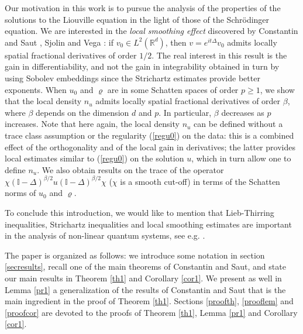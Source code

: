 \documentclass[12pt]{article}
\def \Rm {\mathbb R}
\def\II{\mathbb{I}}
\def\fref#1{{\rm (\ref{#1})}}
\begin{document}
Our motivation in this work is to pursue the analysis of the properties of the solutions to the Liouville equation in the light of those of the Schr\"odinger equation. We are interested in the \textit{local smoothing effect} discovered by Constantin and Saut \cite{ConstSaut}, Sjolin \cite{sjolin} and Vega \cite{vega}: if $v_0 \in L^2(\Rm^d)$, then $v=e^{it\Delta}v_0$ admits locally spatial fractional derivatives of order $1/2$. The real interest in this result is the gain in differentiability, and not the gain in integrability obtained in turn by using Sobolev embeddings since the Strichartz estimates provide better exponents. When $u_0$ and $\varrho$ are in some Schatten spaces of order $p\geq 1$, we show that the local density $n_u$ admits locally spatial fractional derivatives of order $\beta$, where $\beta$ depends on the dimension $d$ and $p$. In particular, $\beta$ decreases as $p$ increases. Note that here again, the local density $n_u$ can be defined without a trace class assumption or the regularity \fref{regu0} on the data: this is a combined effect of the orthogonality and of the local gain in derivatives; the latter provides local estimates similar to \fref{regu0} on the solution $u$, which in turn allow one to define $n_u$. We also obtain results on the trace of the operator $\chi (\II-\Delta)^{\beta/2} u (\II-\Delta)^{\beta/2} \chi$ ($\chi$ is a smooth cut-off) in terms of the Schatten norms of $u_0$ and $\varrho$. 

To conclude this introduction, we would like to mention that Lieb-Thirring inequalities, Strichartz inequalities and local smoothing estimates are important in the analysis of non-linear quantum systems, see e.g. \cite{sabin1, sabin2}.

The paper is organized as follows: we introduce some notation in section \ref{secresults}, recall one of the main theorems of Constantin and Saut, and state our main results in Theorem \ref{th1} and Corollary \ref{cor1}. We present as well in Lemma \ref{pr1} a generalization of the results of Constantin and Saut that is the main ingredient in the proof of Theorem \ref{th1}. Sections \ref{proofth}, \ref{prooflem} and \ref{proofcor} are devoted to the proofs of Theorem \ref{th1}, Lemma \ref{pr1} and Corollary \ref{cor1}.\\
\end{document}

